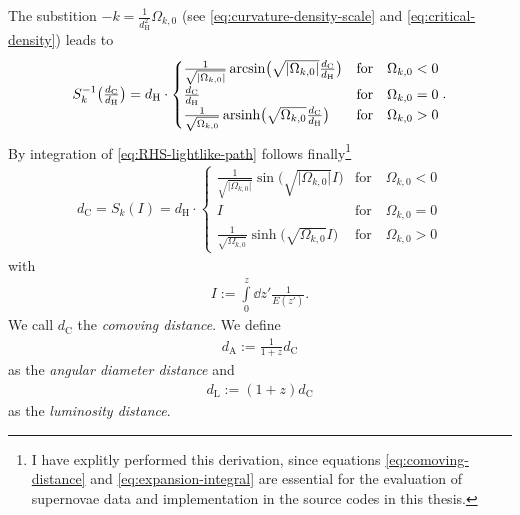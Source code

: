 The substition $\displaystyle -k = \frac{1}{d_{\text{H}}^{2}}\Omega_{k,0}$ (see \eqref{eq:curvature-density-scale} and \eqref{eq:critical-density}) leads to
\begin{align}
    S^{-1}_{k} \bigl( \tfrac{d_{\text{C}}}{d_{\text{H}}} \bigr) = d_{\text{H}} \cdot \begin{cases} 
                                                                                        \frac{1}{\sqrt{\vert \Omega_{k,0} \vert}} \arcsin \bigl(\sqrt{\vert \Omega_{k,0} \vert} \frac{d_{\text{C}}}{d_{\text{H}}} \bigr) &\text{for} \quad \Omega_{k,0} < 0  \\ 
                                                                                        \frac{d_{\text{C}}}{d_{\text{H}}} &\text{for} \quad \Omega_{k,0} = 0 \\ 
                                                                                        \frac{1}{\sqrt{\Omega_{k,0}}} \operatorname{arsinh} \bigl(\sqrt{\Omega_{k,0}} \frac{d_{\text{C}}}{d_{\text{H}}}\bigr) &\text{for} \quad \Omega_{k,0} > 0 
                                                                                                                                                                                               \end{cases}. \label{eq:LHS-lightlike-path}
\end{align}
By integration of \eqref{eq:RHS-lightlike-path} follows finally\footnote{I have explitly performed this derivation, since equations \eqref{eq:comoving-distance} and \eqref{eq:expansion-integral} are essential for the evaluation of supernovae data and implementation in the source codes in this thesis.}
\begin{align}
    d_{\text{C}} = S_{k}(I) = d_{\text{H}} \cdot \begin{cases} 
                                                    \frac{1}{\sqrt{\vert \Omega_{k,0} \vert}} \sin \bigl(\sqrt{\vert \Omega_{k,0} \vert} I \bigr) &\text{for} \quad \Omega_{k,0} < 0 \\ 
                                                    I &\text{for} \quad \Omega_{k,0} = 0 \\  
                                                \frac{1}{\sqrt{\Omega_{k,0}}} \sinh \bigl(\sqrt{\Omega_{k,0}} I \bigr)  &\text{for} \quad \Omega_{k,0} > 0 
                                                \end{cases} \label{eq:comoving-distance} 
\end{align}
with 
\begin{align}
    I := \int\limits_{0}^{z} \dd{z'} \frac{1}{E(z')}. \label{eq:expansion-integral}  
\end{align}
We call $d_{\text{C}}$ the \textit{comoving distance}.
We define 
\begin{align}
    d_{\text{A}} := \frac{1}{1+z} d_{\text{C}} \label{eq:angular-diameter-distance}
\end{align}
as the \textit{angular diameter distance} and 
\begin{align}
    d_{\text{L}} := (1 + z) d_{\text{C}} \label{eq:luminosity-distance}
\end{align}
as the \textit{luminosity distance}.

